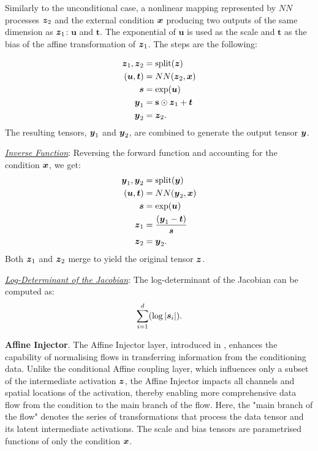 Similarly to the unconditional case, a nonlinear mapping represented by $NN$ processes \(\boldsymbol{z}_2\) and the external condition \(\boldsymbol{x}\) producing two outputs of the same dimension as \(\boldsymbol{z}_1\): \(\boldsymbol{u}\) and \(\boldsymbol{t}\). The exponential of \(\boldsymbol{u}\) is used as the scale and $\boldsymbol{t}$ as the bias of the affine transformation of \(\boldsymbol{z}_1\). The steps are the following:


\begin{align*}
\boldsymbol{z}_1, \boldsymbol{z}_2 &= \text{split}(\boldsymbol{z}) \\
(\boldsymbol{u},\boldsymbol{t}) &= NN(\boldsymbol{z}_2, \boldsymbol{x}) \\
\boldsymbol{s} &= \exp(\boldsymbol{u}) \\
\boldsymbol{y}_1 &= \textbf{s} \odot \boldsymbol{z}_1 + \boldsymbol{t} \\
\boldsymbol{y}_2 &= \boldsymbol{z}_2.
\end{align*}
The resulting tensors, \(\boldsymbol{y}_1\) and \(\boldsymbol{y}_2\), are combined to generate the output tensor \(\boldsymbol{y}\).

\smallskip

\textit{\underline{Inverse Function}}: Reversing the forward function and accounting for the condition \(\boldsymbol{x}\), we get:
\begin{align*}
\boldsymbol{y}_1, \boldsymbol{y}_2 &= \text{split}(\boldsymbol{y}) \\
(\boldsymbol{u},\boldsymbol{t}) &= NN(\boldsymbol{y}_2, \boldsymbol{x}) \\
\boldsymbol{s} &= \exp(\boldsymbol{u}) \\
\boldsymbol{z}_1 &= \frac{(\boldsymbol{y}_1 - \boldsymbol{t})}{\boldsymbol{s}} \\
\boldsymbol{z}_2 &= \boldsymbol{y}_2.
\end{align*}
Both \(\boldsymbol{z}_1\) and \(\boldsymbol{z}_2\) merge to yield the original tensor \(\boldsymbol{z}\).


\smallskip

\textit{\underline{Log-Determinant of the Jacobian}}: The log-determinant of the Jacobian can be computed as:
\[\sum_{i=1}^{d}(\log |\boldsymbol{s}_i|).\]

\textbf{Affine Injector}. The Affine Injector layer, introduced in \cite{SRFLOW}, enhances the capability of normalising flows in transferring information from the conditioning data. Unlike the conditional Affine coupling layer, which influences only a subset of the intermediate activation \(\boldsymbol{z}\), the Affine Injector impacts all channels and spatial locations of the activation, thereby enabling more comprehensive data flow from the condition to the main branch of the flow. Here, the "main branch of the flow" denotes the series of transformations that process the data tensor and its latent intermediate activations. The scale and bias tensors are parametrised functions of only the condition \(\boldsymbol{x}\).

